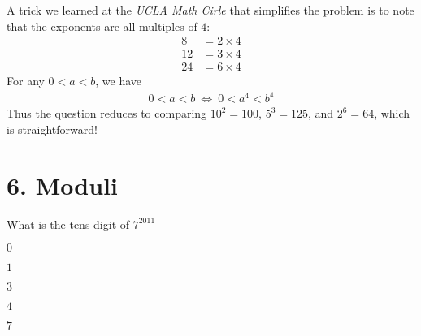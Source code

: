 \documentclass[12pt]{article}
\begin{document}
A trick we learned at the \textit{UCLA Math Cirle} that simplifies the problem is to note that the exponents are all multiples of $4$:
\begin{align*}
 8 & = 2 \times 4 \\
12 & = 3 \times 4 \\
24 & = 6 \times 4
\end{align*}
For any $0<a<b$, we have
\begin{align*}
0 < a < b
~\Longleftrightarrow~
0 < a^4 < b^4
\end{align*}
Thus the question reduces to comparing $10^{2}=100$, $5^{3}=125$, and $2^{6}=64$, which is straightforward!



\newpage
\section*{6. Moduli}
\begin{question}
What is the tens digit of $7^{2011}$ 
\begin{enumerate*}
  \item $0$
  \item $1$
  \item $3$
  \item $4$
  \item $7$
\end{enumerate*}
\end{question}
\end{document}
